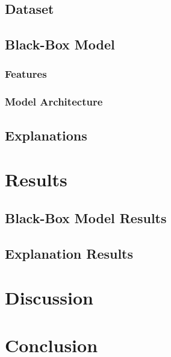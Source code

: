 \documentclass{article}
\begin{document}
		\subsection{Dataset}
		\subsection{Black-Box Model}
			\subsubsection{Features}
			\subsubsection{Model Architecture}
		\subsection{Explanations}
	\section{Results}
		\subsection{Black-Box Model Results}
		\subsection{Explanation Results}
	\section{Discussion}
	\section{Conclusion}
	\newpage
	\printbibliography
\end{document}
